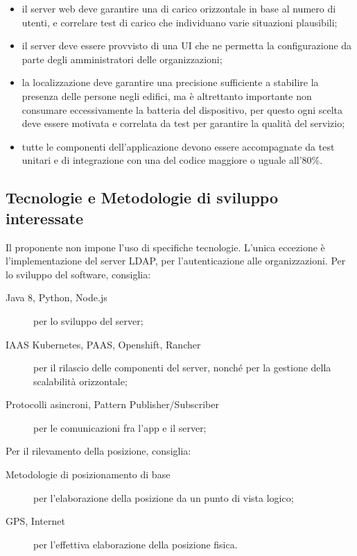 \documentclass[../studio-di-fattibilita.tex]{subfiles}
\begin{document}
\begin{itemize}
    \item il server web deve garantire una  di carico orizzontale in base al numero di utenti, e correlare test di carico che individuano varie situazioni plausibili;
    \item il server deve essere provvisto di una UI che ne permetta la configurazione da parte degli amministratori delle organizzazioni;
    \item la localizzazione deve garantire una precisione sufficiente a stabilire la presenza delle persone negli edifici, ma è altrettanto importante non consumare eccessivamente la batteria del dispositivo, per questo ogni scelta deve essere motivata e correlata da test per garantire la qualità del servizio;
    \item tutte le componenti dell’applicazione devono essere accompagnate da test unitari e di integrazione con una  del codice maggiore o uguale all'80\%.
  \end{itemize}


  \subsection{Tecnologie e Metodologie di sviluppo interessate}%
  \label{subsec:tecnologie_interessate}
  Il proponente non impone l'uso di specifiche tecnologie. L'unica eccezione è l'implementazione del server LDAP, per l'autenticazione alle organizzazioni.
  Per lo sviluppo del software, consiglia:
  \begin{description}
    \item[Java 8, Python, Node.js] per lo sviluppo del server;
    \item[IAAS Kubernetes, PAAS, Openshift, Rancher] per il rilascio delle componenti del server, nonché per la gestione della scalabilità orizzontale;
    \item[Protocolli asincroni, Pattern Publisher/Subscriber] per le comunicazioni fra l'app e il server;
  \end{description}

  Per il rilevamento della posizione, consiglia:
  \begin{description}
    \item[Metodologie di posizionamento di base] per l'elaborazione della posizione da un punto di vista logico;
    \item[GPS, Internet] per l'effettiva elaborazione della posizione fisica.
  \end{description}
\end{document}
